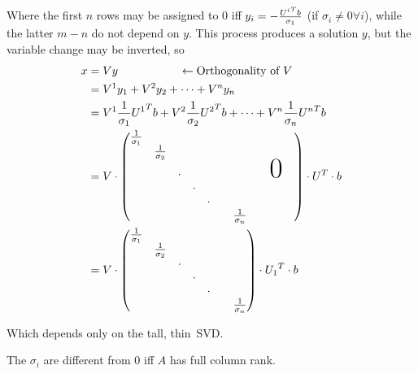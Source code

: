 \documentclass[computationalMathematics.tex]{subfiles}
\begin{document}
Where the first $n$ rows may be assigned to $0$ iff $y_{i} = -\frac{{U^{i}}^{T} b}{\sigma_{1}}$ (if $\sigma_i \neq 0 \forall i$), while the latter $m-n$ do not depend on $y$. This process produces a solution $y$, but the variable change may be inverted, so 
\begin{equation}
  \begin{aligned}
    x &= Vy ~~~~~~~~~~~~~~~~ \leftarrow \text{Orthogonality of} ~V\\
    &= V^1 y_1 + V^2 y_2+ \cdots + V^n y_n\\
    &= V^1 \frac{1}{\sigma_1} \tr{U^1} b + V^2 \frac{1}{\sigma_2} \tr{U^2} b + \cdots + V^n \frac{1}{\sigma_n} \tr{U^n} b\\ 
    &= {V \cdot \begin{pmatrix}
      \frac{1}{\sigma_{1}} & & & & &&&&\\
        & \frac{1}{\sigma_{2}} & & & &&&&\\
        & & \cdot & & & &&&\text{\Huge 0}\\
        & & & \cdot & &&&&\\
        & & & & \cdot &&&&&\\
        & & & & & & \frac{1}{\sigma_{n}}&&&\\
    \end{pmatrix} \cdot \tr{U} \cdot b}\\
    &= {V \cdot \begin{pmatrix}
      \frac{1}{\sigma_{1}} & & & &\\
        & \frac{1}{\sigma_{2}} & & &\\
        & & \cdot & & &\\
        & & & \cdot & &\\
        & & & & \cdot &\\
        & & & & & & \frac{1}{\sigma_{n}}\\
    \end{pmatrix} \cdot \tr{U_1} \cdot b}\\
  \end{aligned}
\end{equation}

Which depends only on the tall, thin~SVD.%
\begin{proposition}
  The $\sigma_{i}$ are different from $0$ iff $A$ has full column rank.
\end{proposition}
\end{document}
